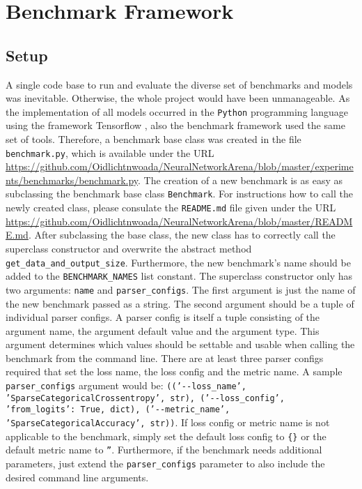 \documentclass[draft,final]{vutinfth} %
\begin{document}
    \section{Benchmark Framework}
    \subsection{Setup}
    A single code base to run and evaluate the diverse set of benchmarks and models was inevitable. 
    Otherwise, the whole project would have been unmanageable.
    As the implementation of all models occurred in the \texttt{Python} programming language \cite{Python3} using the framework Tensorflow \cite{Tensorflow}, also the benchmark framework used the same set of tools.  
    Therefore, a benchmark base class was created in the file \texttt{benchmark.py}, which is available under the URL \url{https://github.com/Oidlichtnwoada/NeuralNetworkArena/blob/master/experiments/benchmarks/benchmark.py}.
    The creation of a new benchmark is as easy as subclassing the benchmark base class \texttt{Benchmark}.
    For instructions how to call the newly created class, please consulate the \texttt{README.md} file given under the URL \url{https://github.com/Oidlichtnwoada/NeuralNetworkArena/blob/master/README.md}.
    After subclassing the base class, the new class has to correctly call the superclass constructor and overwrite the abstract method \texttt{get\_data\_and\_output\_size}.
    Furthermore, the new benchmark's name should be added to the \texttt{BENCHMARK\_NAMES} list constant.
    The superclass constructor only has two arguments: \texttt{name} and \texttt{parser\_configs}. 
    The first argument is just the name of the new benchmark passed as a string.
    The second argument should be a tuple of individual parser configs. 
    A parser config is itself a tuple consisting of the argument name, the argument default value and the argument type.
    This argument determines which values should be settable and usable when calling the benchmark from the command line.
    There are at least three parser configs required that set the loss name, the loss config and the metric name.
    A sample \texttt{parser\_configs} argument would be: \texttt{(('-{}-loss\_name', 'SparseCategoricalCrossentropy', str), ('-{}-loss\_config', {'from\_logits': True}, dict), ('-{}-metric\_name', 'SparseCategoricalAccuracy', str))}.
    If loss config or metric name is not applicable to the benchmark, simply set the default loss config to \texttt{\{\}} or the default metric name to \texttt{''}.
    Furthermore, if the benchmark needs additional parameters, just extend the \texttt{parser\_configs} parameter to also include the desired command line arguments.
\end{document}
